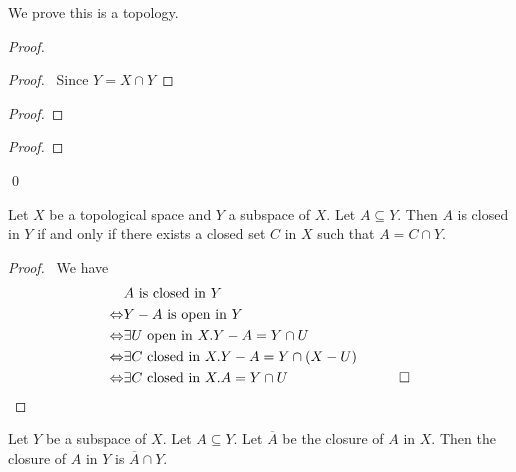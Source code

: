 We prove this is a topology.

\begin{proof}
    \pf
    \begin{proof}
        \pf\ Since $Y = X \cap Y$
    \end{proof}
    \begin{proof}
    \end{proof}
    \begin{proof}
    \end{proof}
    \qed
\end{proof}

\begin{theorem}
    \label{theorem:closed}
    Let $X$ be a topological space and $Y$ a subspace of $X$. Let $A \subseteq Y$. Then $A$ is closed in $Y$
    if and only if there exists a closed set $C$ in $X$ such that $A = C \cap Y$.
\end{theorem}

\begin{proof}
    \pf\ 
    We have
    \begin{align*}
        & A \text{ is closed in } Y \\
        \Leftrightarrow & Y - A \text{ is open in } Y \\
        \Leftrightarrow & \exists U \text{ open in } X. Y - A = Y \cap U \\
        \Leftrightarrow & \exists C \text{ closed in } X. Y - A = Y \cap (X - U) \\
        \Leftrightarrow & \exists C \text{ closed in } X. A = Y \cap U & \qed
    \end{align*}
\end{proof}

\begin{theorem}
    Let $Y$ be a subspace of $X$. Let $A \subseteq Y$. Let $\overline{A}$ be the closure of $A$ in $X$.
    Then the closure of $A$ in $Y$ is $\overline{A} \cap Y$.
\end{theorem}

